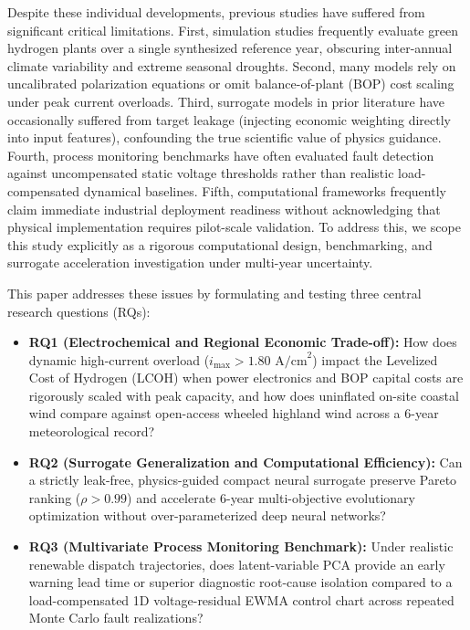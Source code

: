 \documentclass[conference]{IEEEtran}
\begin{document}
Despite these individual developments, previous studies have suffered from significant critical limitations. First, simulation studies frequently evaluate green hydrogen plants over a single synthesized reference year, obscuring inter-annual climate variability and extreme seasonal droughts. Second, many models rely on uncalibrated polarization equations or omit balance-of-plant (BOP) cost scaling under peak current overloads. Third, surrogate models in prior literature have occasionally suffered from target leakage (injecting economic weighting directly into input features), confounding the true scientific value of physics guidance. Fourth, process monitoring benchmarks have often evaluated fault detection against uncompensated static voltage thresholds rather than realistic load-compensated dynamical baselines. Fifth, computational frameworks frequently claim immediate industrial deployment readiness without acknowledging that physical implementation requires pilot-scale validation. To address this, we scope this study explicitly as a rigorous computational design, benchmarking, and surrogate acceleration investigation under multi-year uncertainty.

This paper addresses these issues by formulating and testing three central research questions (RQs):
\begin{itemize}
    \item \textbf{RQ1 (Electrochemical and Regional Economic Trade-off):} How does dynamic high-current overload ($i_{\max} > 1.80\text{ A/cm}^2$) impact the Levelized Cost of Hydrogen (LCOH) when power electronics and BOP capital costs are rigorously scaled with peak capacity, and how does uninflated on-site coastal wind compare against open-access wheeled highland wind across a 6-year meteorological record?
    \item \textbf{RQ2 (Surrogate Generalization and Computational Efficiency):} Can a strictly leak-free, physics-guided compact neural surrogate preserve Pareto ranking ($\rho > 0.99$) and accelerate 6-year multi-objective evolutionary optimization without over-parameterized deep neural networks?
    \item \textbf{RQ3 (Multivariate Process Monitoring Benchmark):} Under realistic renewable dispatch trajectories, does latent-variable PCA provide an early warning lead time or superior diagnostic root-cause isolation compared to a load-compensated 1D voltage-residual EWMA control chart across repeated Monte Carlo fault realizations?
\end{itemize}
\end{document}
